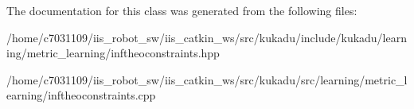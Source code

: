 The documentation for this class was generated from the following files\-:\begin{DoxyCompactItemize}
\item 
/home/c7031109/iis\-\_\-robot\-\_\-sw/iis\-\_\-catkin\-\_\-ws/src/kukadu/include/kukadu/learning/metric\-\_\-learning/inftheoconstraints.\-hpp\item 
/home/c7031109/iis\-\_\-robot\-\_\-sw/iis\-\_\-catkin\-\_\-ws/src/kukadu/src/learning/metric\-\_\-learning/inftheoconstraints.\-cpp\end{DoxyCompactItemize}
